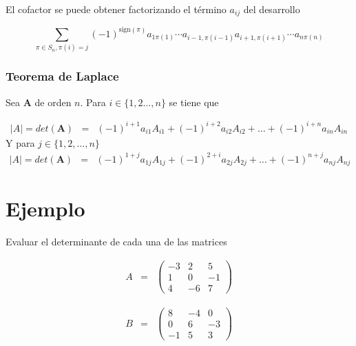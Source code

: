 \documentclass[
]{article}
\begin{document}
El cofactor se puede obtener factorizando el término \(a_{ij}\) del
desarrollo

\[
\sum_{\pi\in S_n, \pi(i)=j} (-1)^{\mbox{sign}(\pi)} a_{1\pi(1)}\cdots a_{i-1,\pi(i-1)}a_{i+1,\pi(i+1)}\cdots a_{n\pi(n)}
\]

\hypertarget{teorema-de-laplace-1}{%
\subsubsection{Teorema de Laplace}\label{teorema-de-laplace-1}}

Sea \(\mathbf{A}\) de orden \(n\). Para \(i\in \{1,2\ldots,n\}\) se
tiene que

\begin{equation}
\begin{array}{ccc}
\left| A \right| = det(\mathbf{A}) &= & (-1)^{i+1}a_{i1}A_{i1} +(-1)^{i+2} a_{i2}A_{i2} + \ldots +(-1)^{i+n} a_{in}A_{in}
\end{array}
\end{equation} Y para \(j \in \{1,2,\ldots, n\}\) \begin{equation}
\begin{array}{ccc}
\left| A \right| = det(\mathbf{A}) &= & (-1)^{1+j}a_{1j}A_{1j} +(-1)^{2+i} a_{2j}A_{2j} + \ldots +(-1)^{n+j} a_{nj}A_{nj}
\end{array}
\end{equation}

\hypertarget{ejemplo-4}{%
\section{Ejemplo}\label{ejemplo-4}}

Evaluar el determinante de cada una de las matrices

\begin{equation*}
\begin{array}{ccc}
A &= & \begin{pmatrix} 
  -3 & 2 & 5 \\
   1 & 0 &-1 \\
   4 &-6 & 7 
        \end{pmatrix}
\end{array}
\end{equation*}

\begin{equation*}
\begin{array}{ccc}
B &= & \begin{pmatrix} 
   8 &-4 & 0 \\
   0 & 6 &-3 \\
  -1 & 5 & 3 
        \end{pmatrix}
\end{array}
\end{equation*}
\end{document}
